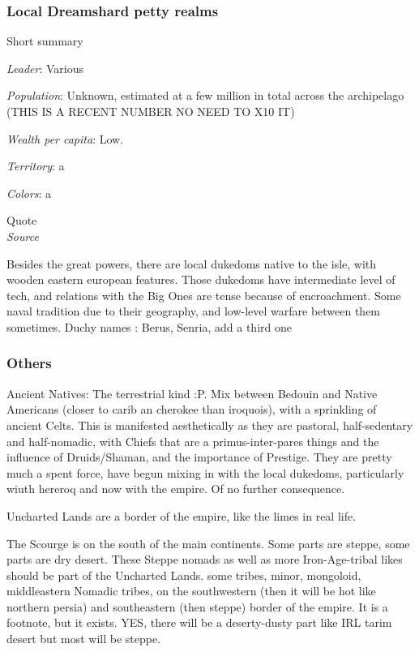 \subsubsection{Local Dreamshard petty realms}


Short summary

\textit{Leader}: Various

\textit{Population}: Unknown, estimated at a few million in total across the archipelago (THIS IS A RECENT NUMBER NO NEED TO X10 IT)

\textit{Wealth per capita}: Low.

\textit{Territory}: a
    
\textit{Colors}: a

\begin{rpg-quotebox}
Quote \\ \textendash \textit{Source}
\end{rpg-quotebox}

Besides the great powers, there are local dukedoms native to the isle, with wooden eastern european features. Those dukedoms have intermediate level of tech, and relations with the Big Ones are tense because of encroachment. Some naval tradition due to their geography, and low-level warfare between them sometimes.
	Duchy names : Berus, Senria, add a third one

\subsubsection{Others}



Ancient Natives: The terrestrial kind :P. Mix between Bedouin and Native Americans (closer to carib an cherokee than iroquois), with a sprinkling of ancient Celts. This is manifested aesthetically as they are pastoral, half-sedentary and half-nomadic, with Chiefs that are a primus-inter-pares things and the influence of Druids/Shaman, and the importance of Prestige. They are pretty much a spent force, have begun mixing in with the local dukedoms, particularly wiuth hereroq and now with the empire. Of no further consequence.

Uncharted Lands are a border of the empire, like the limes in real life.

The Scourge is on the south of the main continents. Some parts are steppe, some parts are dry desert. These Steppe nomads as well as more Iron-Age-tribal likes should be part of the Uncharted Lands. some tribes, minor, mongoloid, middleastern
Nomadic tribes, on the southwestern (then it will be hot like northern persia) and southeastern (then steppe) border of the empire. It is a footnote, but it exists. YES, there will be a deserty-dusty part like IRL tarim desert but most will be steppe.







